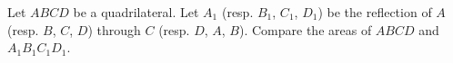 Let $ABCD$ be a quadrilateral. Let $A_1$ (resp. $B_1$, $C_1$, $D_1$) be the reflection of $A$ (resp. $B$, $C$, $D$) through $C$ (resp. $D$, $A$, $B$). Compare the areas of $ABCD$ and $A_1B_1C_1D_1$.
